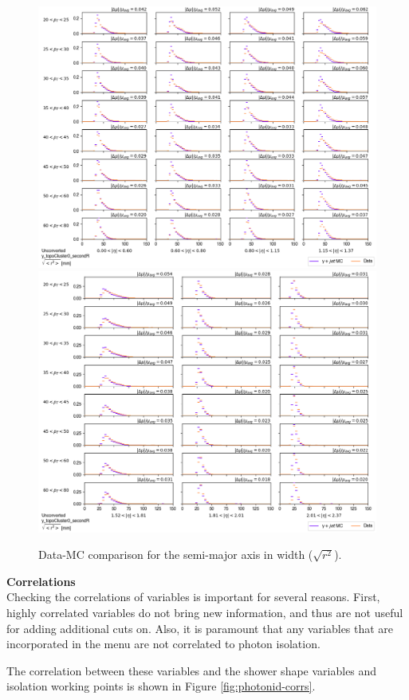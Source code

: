 \begin{figure}[!thp]
    \centering
    \includegraphics[width=.80\textwidth]{chapters/chapter4_photonID/images/y_topoCluster0_secondR_Unconverted_lowerEta.png}
    \includegraphics[width=.80\textwidth]{chapters/chapter4_photonID/images/y_topoCluster0_secondR_Unconverted_upperEta.png}
    \caption{Data-MC comparison for the semi-major axis in width ($\sqrt{r^2}$).}
\end{figure}

\noindent\textbf{Correlations}\\
\indent Checking the correlations of variables is important for several reasons. First, highly correlated variables do not bring new information, and thus are not useful for adding additional cuts on. Also, it is paramount that any variables that are incorporated in the menu are not correlated to photon isolation.

The correlation between these variables and the shower shape variables and isolation working points is shown in Figure \ref{fig:photonid-corrs}.

